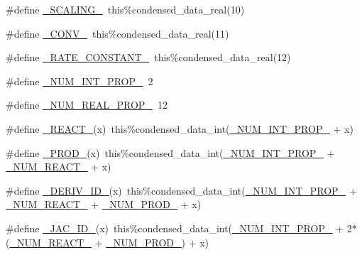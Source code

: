 \begin{DoxyCompactItemize}
\#define \mbox{\hyperlink{rxn___c_m_a_q___o_h___h_n_o3_8_f90_a44b5bdc8cf91427e717c13d7c925db84}{\+\_\+\+S\+C\+A\+L\+I\+N\+G\+\_\+}}~this\%condensed\+\_\+data\+\_\+real(10)
\item 
\#define \mbox{\hyperlink{rxn___c_m_a_q___o_h___h_n_o3_8_f90_a8d22506f8671e195690022c44d319caf}{\+\_\+\+C\+O\+N\+V\+\_\+}}~this\%condensed\+\_\+data\+\_\+real(11)
\item 
\#define \mbox{\hyperlink{rxn___c_m_a_q___o_h___h_n_o3_8_f90_a90fa57a01e99ca76df9ef2ac521667ec}{\+\_\+\+R\+A\+T\+E\+\_\+\+C\+O\+N\+S\+T\+A\+N\+T\+\_\+}}~this\%condensed\+\_\+data\+\_\+real(12)
\item 
\#define \mbox{\hyperlink{rxn___c_m_a_q___o_h___h_n_o3_8_f90_a54f7194dc6a244f7eb7a78f88b3362ba}{\+\_\+\+N\+U\+M\+\_\+\+I\+N\+T\+\_\+\+P\+R\+O\+P\+\_\+}}~2
\item 
\#define \mbox{\hyperlink{rxn___c_m_a_q___o_h___h_n_o3_8_f90_a242fac7fe42c0d62936c65735dc023a6}{\+\_\+\+N\+U\+M\+\_\+\+R\+E\+A\+L\+\_\+\+P\+R\+O\+P\+\_\+}}~12
\item 
\#define \mbox{\hyperlink{rxn___c_m_a_q___o_h___h_n_o3_8_f90_a2465fb6c1cce932a0bb29dac2975ee64}{\+\_\+\+R\+E\+A\+C\+T\+\_\+}}(x)~this\%condensed\+\_\+data\+\_\+int(\mbox{\hyperlink{sub__model___u_n_i_f_a_c_8_f90_a54f7194dc6a244f7eb7a78f88b3362ba}{\+\_\+\+N\+U\+M\+\_\+\+I\+N\+T\+\_\+\+P\+R\+O\+P\+\_\+}} + x)
\item 
\#define \mbox{\hyperlink{rxn___c_m_a_q___o_h___h_n_o3_8_f90_ad730666d44e45e220232510d9e15ec79}{\+\_\+\+P\+R\+O\+D\+\_\+}}(x)~this\%condensed\+\_\+data\+\_\+int(\mbox{\hyperlink{sub__model___u_n_i_f_a_c_8_f90_a54f7194dc6a244f7eb7a78f88b3362ba}{\+\_\+\+N\+U\+M\+\_\+\+I\+N\+T\+\_\+\+P\+R\+O\+P\+\_\+}} + \mbox{\hyperlink{rxn__troe_8_f90_aee1fee52189b85b8a55162815b7eb2ab}{\+\_\+\+N\+U\+M\+\_\+\+R\+E\+A\+C\+T\+\_\+}} + x)
\item 
\#define \mbox{\hyperlink{rxn___c_m_a_q___o_h___h_n_o3_8_f90_a8df20fa2e866ca68998160fdeef08b19}{\+\_\+\+D\+E\+R\+I\+V\+\_\+\+I\+D\+\_\+}}(x)~this\%condensed\+\_\+data\+\_\+int(\mbox{\hyperlink{sub__model___u_n_i_f_a_c_8_f90_a54f7194dc6a244f7eb7a78f88b3362ba}{\+\_\+\+N\+U\+M\+\_\+\+I\+N\+T\+\_\+\+P\+R\+O\+P\+\_\+}} + \mbox{\hyperlink{rxn__troe_8_f90_aee1fee52189b85b8a55162815b7eb2ab}{\+\_\+\+N\+U\+M\+\_\+\+R\+E\+A\+C\+T\+\_\+}} + \mbox{\hyperlink{rxn__troe_8_f90_a0ab2d7e00e334b5c52335f26ef6025e8}{\+\_\+\+N\+U\+M\+\_\+\+P\+R\+O\+D\+\_\+}} + x)
\item 
\#define \mbox{\hyperlink{rxn___c_m_a_q___o_h___h_n_o3_8_f90_af0ecfa7b0240c903b78101cd3e4ac0c7}{\+\_\+\+J\+A\+C\+\_\+\+I\+D\+\_\+}}(x)~this\%condensed\+\_\+data\+\_\+int(\mbox{\hyperlink{sub__model___u_n_i_f_a_c_8_f90_a54f7194dc6a244f7eb7a78f88b3362ba}{\+\_\+\+N\+U\+M\+\_\+\+I\+N\+T\+\_\+\+P\+R\+O\+P\+\_\+}} + 2$\ast$(\mbox{\hyperlink{rxn__troe_8_f90_aee1fee52189b85b8a55162815b7eb2ab}{\+\_\+\+N\+U\+M\+\_\+\+R\+E\+A\+C\+T\+\_\+}} + \mbox{\hyperlink{rxn__troe_8_f90_a0ab2d7e00e334b5c52335f26ef6025e8}{\+\_\+\+N\+U\+M\+\_\+\+P\+R\+O\+D\+\_\+}}) + x)

\end{DoxyCompactItemize}
